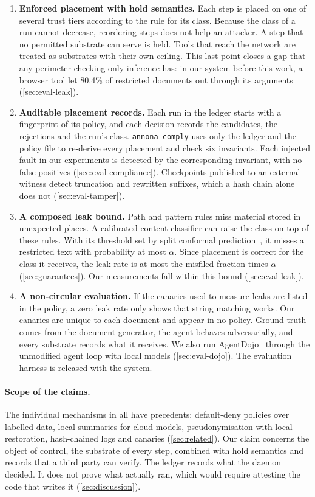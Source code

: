 \begin{enumerate}[leftmargin=*]
  \item \textbf{Enforced placement with hold semantics.} Each step is placed on one of several
    trust tiers according to the rule for its class. Because the class of a run cannot
    decrease, reordering steps does not help an attacker. A step that no permitted substrate
    can serve is held. Tools that reach the network are treated as substrates with their own
    ceiling. This last point closes a gap that any perimeter checking only inference has: in
    our system before this work, a browser tool let 80.4\% of restricted documents out through
    its arguments (\cref{sec:eval-leak}).
  \item \textbf{Auditable placement records.} Each run in the ledger starts with a fingerprint
    of its policy, and each decision records the candidates, the rejections and the run's
    class. \texttt{annona comply} uses only the ledger and the policy file to re-derive every
    placement and check six invariants. Each injected fault in our experiments is detected by
    the corresponding invariant, with no false positives (\cref{sec:eval-compliance}).
    Checkpoints published to an external witness detect truncation and rewritten suffixes,
    which a hash chain alone does not (\cref{sec:eval-tamper}).
  \item \textbf{A composed leak bound.} Path and pattern rules miss material stored in
    unexpected places. A calibrated content classifier can raise the class on top of these
    rules. With its threshold set by split conformal prediction~\citep{vovk2005alrw}, it
    misses a restricted text with probability at most $\alpha$. Since placement is correct for
    the class it receives, the leak rate is at most the misfiled fraction times $\alpha$
    (\cref{sec:guarantees}). Our measurements fall within this bound (\cref{sec:eval-leak}).
  \item \textbf{A non-circular evaluation.} If the canaries used to measure leaks are listed in
    the policy, a zero leak rate only shows that string matching works. Our canaries are unique
    to each document and appear in no policy. Ground truth comes from the document generator,
    the agent behaves adversarially, and every substrate records what it receives. We also run
    AgentDojo~\citep{debenedetti2024agentdojo} through the unmodified agent loop with local
    models (\cref{sec:eval-dojo}). The evaluation harness is released with the system.
\end{enumerate}

\paragraph{Scope of the claims.} The individual mechanisms in \annona{} all have precedents:
default-deny policies over labelled data, local summaries for cloud models, pseudonymisation
with local restoration, hash-chained logs and canaries (\cref{sec:related}). Our claim concerns
the object of control, the substrate of every step, combined with hold semantics and records
that a third party can verify. The ledger records what the daemon decided. It does not prove
what actually ran, which would require attesting the code that writes it
(\cref{sec:discussion}).
